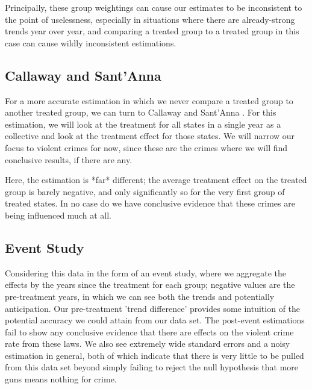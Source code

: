 \documentclass{article}
\begin{document}
Principally, these group weightings can cause our estimates to be inconsistent to the point of uselessness, especially in situations where there are already-strong trends year over year, and comparing a treated group to a treated group in this case can cause wildly inconsistent estimations.

\subsection{Callaway and Sant'Anna}

For a more accurate estimation in which we never compare a treated group to another treated group, we can turn to Callaway and Sant'Anna \cite{CallawaySantanna}. For this estimation, we will look at the treatment for all states in a single year as a collective and look at the treatment effect for those states. We will narrow our focus to violent crimes for now, since these are the crimes where we will find conclusive results, if there are any. 



Here, the estimation is *far* different; the average treatment effect on the treated group is barely negative, and only significantly so for the very first group of treated states. In no case do we have conclusive evidence that these crimes are being influenced much at all.

\subsection{Event Study}

Considering this data in the form of an event study, where we aggregate the effects by the years since the treatment for each group; negative values are the pre-treatment years, in which we can see both the trends and potentially anticipation. Our pre-treatment 'trend difference' provides some intuition of the potential accuracy we could attain from our data set. The post-event estimations fail to show any conclusive evidence that there are effects on the violent crime rate from these laws. We also see extremely wide standard errors and a noisy estimation in general, both of which indicate that there is very little to be pulled from this data set beyond simply failing to reject the null hypothesis that more guns means nothing for crime.


\end{document}
